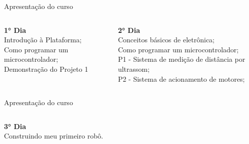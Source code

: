\documentclass{cubeamer}
\begin{document}
\begin{frame}{Apresentação do curso}
    \begin{columns}
        \centering
        \begin{column}{0.4\textwidth}
            \textbf{1° Dia} \\
            \small
            Introdução à Plataforma;\\
            Como programar um microcontrolador;\\
            Demonstração do Projeto 1\\

        \end{column}
        \begin{column}{0.5\textwidth}
            \textbf{2° Dia} \\
            \small
            Conceitos básicos de eletrônica;\\
            Como programar um microcontrolador;\\
            P1 - Sistema de medição de distância por ultrassom;\\
            P2 - Sistema de acionamento de motores;\\
        \end{column}
    \end{columns}
\end{frame}

\begin{frame}{Apresentação do curso}
    \begin{columns}
        \centering
        \begin{column}{0.5\textwidth}
            \textbf{3° Dia} \\
            \small
            Construindo meu primeiro robô.
        \end{column}
    \end{columns}
\end{frame}
\end{document}
